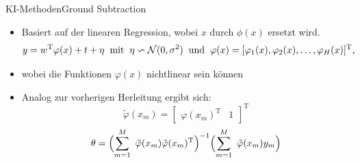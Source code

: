 \documentclass[169, handout	]{THIbeamer} %
\begin{document}
\begin{frame}{KI-Methoden}{Ground Subtraction}
	\begin{itemize}
		\item Basiert auf der linearen Regression, wobei $x$ durch $\phi (x)$ ersetzt wird.
		\begin{equation}
			y = w^{\text{T}} \varphi (x) + t + \eta
			\hspace{0.2 cm}
			\text{mit}
			\hspace{0.2 cm}
			\eta \backsim \mathcal{N}(0, \sigma^2)
			\hspace{0.2 cm}
			\text{und} \hspace{0.2 cm} 			
			\varphi (x) = [ \varphi_1 (x), \varphi_2 (x), \dots, \varphi_H (x)]^{\text{T}} \text{,}
		\end{equation}
		\item[] wobei die Funktionen $\varphi (x)$ nichtlinear sein können
		\item Analog zur vorherigen Herleitung ergibt sich:
		\begin{equation}
			\tilde{\varphi} (x_m)= 
			\begin{bmatrix}
				\varphi (x_m)^{\text{T}} & 1
			\end{bmatrix}^{\text{T}}
		\end{equation}
		\begin{equation}
			\theta = \Bigl( \sum_{m=1}^M\ \tilde{\varphi} (x_m) \tilde{\varphi} (x_m)^{\text{T}} \Bigr)^{-1} \Bigl( \sum_{m=1}^M\ \tilde{\varphi} (x_m) y_m \Bigr) 
		\end{equation}
	\end{itemize}
\end{frame}
\end{document}

